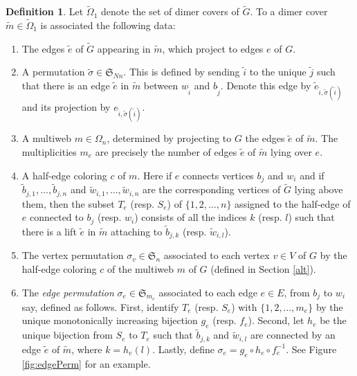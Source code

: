 \documentclass[12pt, reqno]{amsart}
\theoremstyle{definition}
\newtheorem{defi}[theo]{Definition}
\renewcommand{\tilde}{\widetilde}
\begin{document}
\begin{defi}
Let $\tilde{\Omega}_1$ denote the set of dimer covers of $\tilde{G}$.  To a dimer cover $\tilde{m}\in\tilde{\Omega}_1$ is associated the following data:  
\begin{enumerate}
\item  
The edges $\tilde{e}$ of $\tilde{G}$ appearing in $\tilde{m}$, which project to edges $e$ of $G$.  
\item 
A permutation $\tilde{\sigma}\in\mathfrak{S}_{Nn}$.  This is defined by sending $\tilde{i}$ to the unique $\tilde{j}$ such that there is an edge $\tilde{e}$ in $\tilde{m}$ between $w_{\tilde{i}}$ and $b_{\tilde{j}}$.  Denote this edge by $\tilde{e}_{\tilde{i},\tilde{\sigma}(\tilde{i})}$ and its projection by $e_{\tilde{i},\tilde{\sigma}(\tilde{i})}$.  
\item  
A multiweb $m\in\Omega_n$, determined by projecting to $G$ the edges $\tilde{e}$ of $\tilde{m}$.  The multiplicities $m_e$ are precisely the number of edges $\tilde{e}$ of $\tilde{m}$ lying over $e$.  
\item 
A half-edge coloring $c$ of $m$.  Here if $e$ connects vertices $b_j$ and $w_i$ and if $\tilde{b}_{j,1}, \dots, \tilde{b}_{j,n}$ and $\tilde{w}_{i,1}, \dots, \tilde{w}_{i,n}$ are the corresponding vertices of $\tilde{G}$ lying above them, then the subset $T_e$ (resp. $S_e$) of $\{1,2,\dots,n\}$ assigned to the half-edge of $e$ connected to $b_j$ (resp. $w_i$) consists of all the indices $k$ (resp. $l$) such that there is a lift $\tilde{e}$ in $\tilde{m}$ attaching to $\tilde{b}_{j,k}$ (resp. $\tilde{w}_{i,l}$).
\item 
The vertex permutation $\sigma_v\in \mathfrak{S}_n$ associated to each vertex $v\in V$ of $G$ by the half-edge coloring $c$ of the multiweb $m$ of $G$ (defined in Section \ref{alt}).
\item\label{enum:item:definitionofh}
The \emph{edge permutation} $\sigma_e\in \mathfrak{S}_{m_e}$ associated to each edge $e\in E$, from $b_j$ to $w_i$ say, defined as follows.    First, identify $T_e$ (resp. $S_e$) with $\{1,2,\dots,m_e\}$ by the unique monotonically increasing bijection $g_e$ (resp. $f_e$).    Second, let $h_e$ be the unique bijection from $S_e$ to $T_e$ such that $\tilde b_{j,k}$ and  $\tilde w_{i,l}$ are connected by an edge $\tilde{e}$ of $\tilde{m}$, where $k=h_e(l)$.    Lastly, define $\sigma_e=g_e \circ h_e\circ f_e^{-1}$. See Figure \ref{fig:edgePerm} for an example.
\end{enumerate}


\end{defi}
\end{document}
